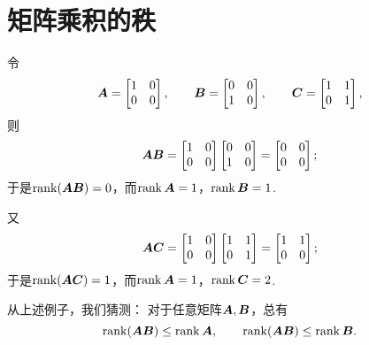 \section{矩阵乘积的秩}
令\begin{equation*}
	\boldsymbol{A}=\begin{bmatrix}
		1 & 0 \\
		0 & 0
	\end{bmatrix}, \qquad
	\boldsymbol{B}=\begin{bmatrix}
		0 & 0 \\
		1 & 0
	\end{bmatrix}, \qquad
	\boldsymbol{C}=\begin{bmatrix}
		1 & 1 \\
		0 & 1
	\end{bmatrix},
\end{equation*}
则\begin{equation*}
	\boldsymbol{A} \boldsymbol{B}=\begin{bmatrix}
		1 & 0 \\
		0 & 0
	\end{bmatrix}
	\begin{bmatrix}
		0 & 0 \\
		1 & 0
	\end{bmatrix}
	= \begin{bmatrix}
		0 & 0 \\
		0 & 0
	\end{bmatrix};
\end{equation*}
于是\(\rank(\boldsymbol{A} \boldsymbol{B})=0\)，而\(\rank\boldsymbol{A}=1\)，\(\rank\boldsymbol{B}=1\).

又\begin{equation*}
	\boldsymbol{A}\boldsymbol{C}=\begin{bmatrix}
		1 & 0 \\
		0 & 0
	\end{bmatrix}
	\begin{bmatrix}
		1 & 1 \\
		0 & 1
	\end{bmatrix}
	= \begin{bmatrix}
		1 & 1 \\
		0 & 0
	\end{bmatrix};
\end{equation*}
于是\(\rank(\boldsymbol{A}\boldsymbol{C})=1\)，而\(\rank\boldsymbol{A}=1\)，\(\rank\boldsymbol{C}=2\).

从上述例子，我们猜测：
对于任意矩阵\(\boldsymbol{A},\boldsymbol{B}\)，总有\begin{equation*}
	\rank(\boldsymbol{A} \boldsymbol{B}) \leq \rank\boldsymbol{A}, \qquad
	\rank(\boldsymbol{A} \boldsymbol{B}) \leq \rank\boldsymbol{B}.
\end{equation*}

